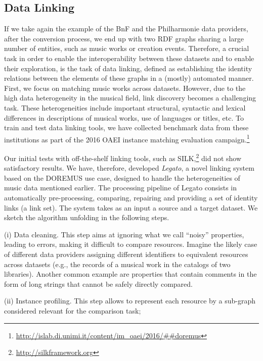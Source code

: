 \subsection{Data Linking} \label{subsec:datalinking}
If we take again the example of the BnF and the Philharmonie data providers, after the conversion process, we end up with two RDF graphs sharing a large number of entities, such as music works or creation events. Therefore, a crucial task in order to enable the interoperability between these datasets and to enable their exploration, is the task of data linking, defined as establishing the identity relations between the elements of these graphs in a (mostly) automated manner. First, we focus on matching music works across datasets. However, due to the high data heterogeneity in the musical field, link discovery becomes a challenging task. These heterogeneities include important structural, syntactic and lexical differences in descriptions of musical works, use of languages or titles, etc. To train and test data linking tools, we have collected benchmark data from these institutions as part of the 2016 OAEI instance matching evaluation campaign.\footnote{\url{http://islab.di.unimi.it/content/im_oaei/2016/##doremus}}

Our initial tests with off-the-shelf linking tools, such as SILK,\footnote{\url{http://silkframework.org}} did not show satisfactory results. We have, therefore, developed \textit{Legato}, a novel linking system based on the DOREMUS use case, designed to handle the heterogeneities of music data mentioned earlier. The processing pipeline of Legato consists in automatically pre-processing, comparing, repairing and providing a set of identity links (a link set). The system takes as an input a source and a target dataset. We sketch the algorithm unfolding in the following steps.
 
(i) Data cleaning. This step aims at ignoring what we call ``noisy'' properties, leading to errors, making it difficult to compare resources. Imagine the likely case of different data providers assigning different identifiers to equivalent resources across datasets (e.g., the records of a musical work in the catalogs of two libraries). Another common example are properties that contain comments in the form of long strings that cannot be safely directly compared. 

(ii) Instance profiling. This step allows to represent each resource by a sub-graph considered relevant for the comparison task;

